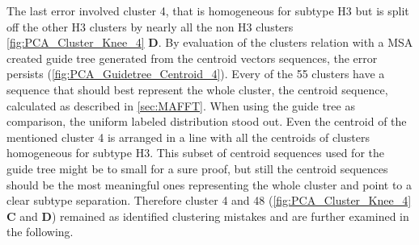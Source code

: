 \vspace{1em}

The last error involved cluster 4, that is homogeneous for subtype H3 but is split off the other H3 clusters by nearly all the non H3 clusters \autoref{fig:PCA_Cluster_Knee_4} \textbf{\textsf{D}}. By evaluation of the clusters relation with a \gls{MSA} created guide tree generated from the centroid vectors sequences, the error persists (\autoref{fig:PCA_Guidetree_Centroid_4}). Every of the 55 clusters have a sequence that should best represent the whole cluster, the centroid sequence, calculated as described in \autoref{sec:MAFFT}. When using the guide tree as comparison, the uniform labeled distribution stood out. Even the centroid of the mentioned cluster 4 is arranged in a line with all the centroids of clusters homogeneous for subtype H3. This subset of centroid sequences used for the guide tree might be to small for a sure proof, but still the centroid sequences should be the most meaningful ones representing the whole cluster and point to a clear subtype separation. Therefore cluster 4 and 48 (\autoref{fig:PCA_Cluster_Knee_4} \textbf{\textsf{C}} and \textbf{\textsf{D}}) remained as identified clustering mistakes and are further examined in the following.

